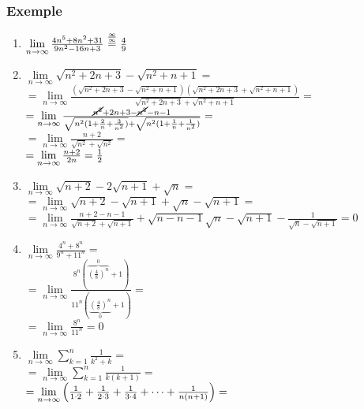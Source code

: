 \documentclass[a4paper, 12pt, notitlepage]{book}
\begin{document}
    \subsubsection{Exemple}
    \begin{enumerate}
      \item $\lim\limits_{n\to\infty} \frac{4n^{5} + 8n^{2} + 31}{9n^{2} - 16n + 3} \stackrel{\infty \over \infty}{=} {4 \over 9}$
      \item $\lim\limits_{n\to\infty} \sqrt{n^{2} +2n +3} - \sqrt{n^{2} + n + 1}=$\\[5pt]
            $= \lim\limits_{n\to\infty} \frac{(\sqrt{n^{2} +2n +3} - \sqrt{n^{2} + n + 1})(\sqrt{n^{2} +2n +3} + \sqrt{n^{2} + n + 1})}{\sqrt{n^{2} +2n +3} + \sqrt{n^{2} + n + 1}}=$\\[5pt]
            $= \lim\limits_{n\to\infty} \frac{\cancel{n^{2}} +2n +3 - \cancel{n^{2}} - n - 1}{\sqrt{n^{2}(1 + \frac{2}{n} + {3 \over n^{2}})} + \sqrt{n^{2}(1 + {1 \over n} + {1 \over n^{2}})}}=$\\[5pt]
            $= \lim\limits_{n\to\infty} \frac{n+2}{\sqrt{n^{2}} + \sqrt{n^{2}}}=$\\[5pt]
            $= \lim\limits_{n\to\infty} \frac{n+2}{2n}= {1 \over 2}$
      \item $\lim\limits_{n\to\infty} \sqrt{n+2} - 2\sqrt{n+1} + \sqrt{n}=$\\[5pt]
            $= \lim\limits_{n\to\infty} \sqrt{n+2} - \sqrt{n+1} + \sqrt{n} - \sqrt{n+1}=$\\[5pt]
            $= \lim\limits_{n\to\infty} \frac{n+2 - n - 1}{\sqrt{n+2} + \sqrt{n+1}} + \sqrt{n - n - 1}{\sqrt{n} - \sqrt{n+1}} - \frac{1}{\sqrt{n} - \sqrt{n+1}} = 0$\\[5pt]
      \item $\lim\limits_{n\to\infty} \frac{4^{n} + 8^{n}}{9^{n} + 11^{n}} =$\\[5pt]
            $= \lim\limits_{n\to\infty} \frac{8^{n} \left( \overbrace{{ \left(\frac{4}{8} \right)}^{n}}^{0} + 1 \right)}{11^{n} \left( \underbrace{{ \left( \frac{4}{8} \right) }^{n}}_{0} + 1 \right)} =$\\[5pt]
            $= \lim\limits_{n\to\infty} \frac{8^{n}}{11^{n}} = 0$\\[5pt]
      \item $\lim\limits_{n\to\infty} \sum\limits_{k=1}^{n} \frac{1}{k^{2} + k} =$\\[5pt]
            $= \lim\limits_{n\to\infty} \sum\limits_{k=1}^{n} \frac{1}{k(k+1)} =$\\[5pt]
            $= \lim\limits_{n\to\infty} \left( {1 \over 1 \cdot 2} + {1 \over 2 \cdot 3} + {1 \over 3 \cdot 4} + \cdots + \frac{1}{n(n+1)} \right) =$\\[5pt]

\end{enumerate}
\end{document}
